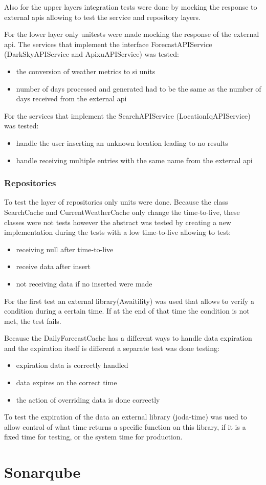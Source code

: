 \documentclass[12pt]{article}
\begin{document}
Also for the upper layers integration tests were done by mocking the response to external
  apis allowing to test the service and repository layers.

For the lower layer only unitests were made mocking the response of the external api. The
  services that implement the interface ForecastAPIService (DarkSkyAPIService and
  ApixuAPIService) was tested:
  \begin{itemize}
    \item the conversion of weather metrics to si units
    \item number of days processed and generated had to be the same as the number of days
      received from the external api
  \end{itemize}
  For the services that implement the SearchAPIService (LocationIqAPIService) was tested:
  \begin{itemize}
    \item handle the user inserting an unknown location leading to no results
    \item handle receiving multiple entries with the same name from the external api
  \end{itemize}

\subsubsection{Repositories}

To test the layer of repositories only units were done. Because the class SearchCache and
  CurrentWeatherCache only change the time-to-live, these classes were not tests however
  the abstract was tested by creating a new implementation during the tests with a low
  time-to-live allowing to test:
  \begin{itemize}
    \item receiving null after time-to-live
    \item receive data after insert
    \item not receiving data if no inserted were made
  \end{itemize}
  For the first test an external library(Awaitility) was used that allows to verify a condition
    during a certain time. If at the end of that time the condition is not met,
    the test fails.

Because the DailyForecastCache has a different ways to handle data expiration and
  the expiration itself is different a separate test was done testing:
  \begin{itemize}
    \item expiration data is correctly handled
    \item data expires on the correct time
    \item the action of overriding data is done correctly
  \end{itemize}
  To test the expiration of the data an external library (joda-time) was used to allow
    control of what time returns a specific function on this library, if it is a
    fixed time for testing, or the system time for production.

\section{Sonarqube}
\end{document}
